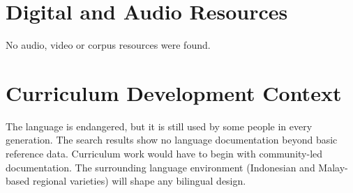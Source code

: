\documentclass[12pt]{article}
\begin{document}
\section{Digital and Audio Resources}
No audio, video or corpus resources were found.

\section{Curriculum Development Context}
The language is endangered, but it is still used by some people in every generation. The search results show no language documentation beyond basic reference data. Curriculum work would have to begin with community-led documentation. The surrounding language environment (Indonesian and Malay-based regional varieties) will shape any bilingual design.
\end{document}
